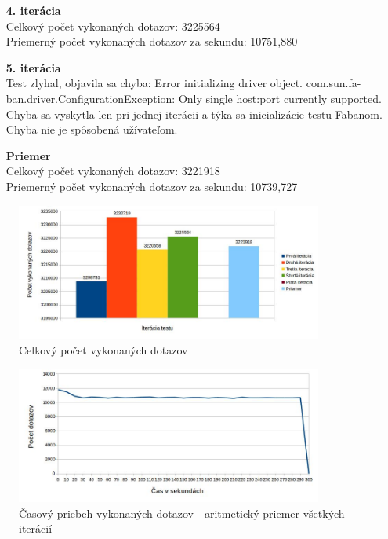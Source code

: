 \documentclass[12pt,oneside,final]{fithesis-utf8}
\begin{document}
\begin{itemize}
\begin{itemize}
\item[\textbf{4. iterácia}]\ \\
Celkový počet vykonaných dotazov: 3225564\\
Priemerný počet vykonaných dotazov za sekundu: 10751,880

\item[\textbf{5. iterácia}]\ \\
Test zlyhal, objavila sa chyba: Error initializing driver object. com.sun.fa-ban.driver.ConfigurationException: Only single host:port currently supported.\\ Chyba sa vyskytla len pri jednej iterácii a týka sa inicializácie testu Fabanom. Chyba nie je spôsobená užívateľom. \hypertarget{label}{}

\item[\textbf{Priemer}]\ \\
Celkový počet vykonaných dotazov: 3221918\\
Priemerný počet vykonaných dotazov za sekundu: 10739,727

\end{itemize}

\begin{figure}[H]
  \centering
      \includegraphics[width=0.9\textwidth]{faban2_3.jpg}
  \caption{Celkový počet vykonaných dotazov}
\end{figure}

\begin{figure}[H]
  \centering
      \includegraphics[width=0.9\textwidth]{faban2_3_distr.jpg}
  \caption{Časový priebeh vykonaných dotazov - aritmetický priemer všetkých iterácií}
\end{figure}


\end{itemize}
\end{document}
